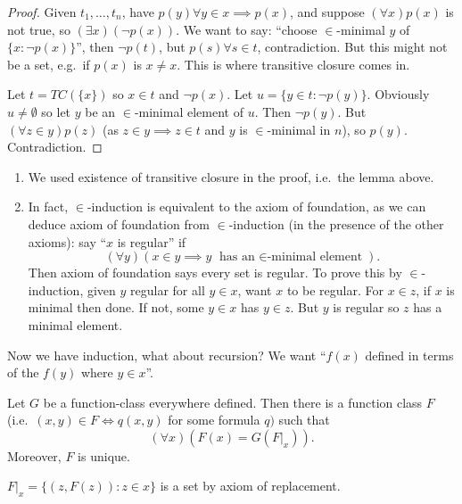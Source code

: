 \documentclass[a4paper]{article}
\begin{document}
\begin{proof}
  Given \(t_1, \dots, t_n\), have \(p(y) \forall y \in x \implies p(x)\), and suppose \((\forall x) p(x)\) is not true, so \((\exists x) (\neg p(x))\). We want to say: ``choose \(\in\)-minimal \(y\) of \(\{x: \neg p(x)\}\)'', then \(\neg p(t)\), but \(p(s) \forall s \in t\), contradiction. But this might not be a set, e.g.\ if \(p(x)\) is \(x \neq x\). This is where transitive closure comes in.

  Let \(t = TC(\{x\})\) so \(x \in t\) and \(\neg p(x)\). Let \(u = \{y \in t: \neg p(y)\}\). Obviously \(u \neq \emptyset\) so let \(y\) be an \(\in\)-minimal element of \(u\). Then \(\neg p(y)\). But \((\forall z \in y) p(z)\) (as \(z \in y \implies z \in t\) and \(y\) is \(\in\)-minimal in \(n\)), so \(p(y)\). Contradiction.
\end{proof}

\begin{remark}\leavevmode
  \begin{enumerate}
  \item We used existence of transitive closure in the proof, i.e.\ the lemma above.
  \item In fact, \(\in\)-induction is equivalent to the axiom of foundation, as we can deduce axiom of foundation from \(\in\)-induction (in the presence of the other axioms): say ``\(x\) is regular'' if
    \[
      (\forall y) (x \in y \implies y \text{ has an \(\in\)-minimal element}).
    \]
    Then axiom of foundation says every set is regular. To prove this by \(\in\)-induction, given \(y\) regular for all \(y \in x\), want \(x\) to be regular. For \(x \in z\), if \(x\) is minimal then done. If not, some \(y \in x\) has \(y \in z\). But \(y\) is regular so \(z\) has a minimal element.
  \end{enumerate}
\end{remark}

Now we have induction, what about recursion? We want ``\(f(x)\) defined in terms of the \(f(y)\) where \(y \in x\)''.

\begin{theorem}[\(\in\)-recursion]
  Let \(G\) be a function-class everywhere defined. Then there is a function class \(F\) (i.e.\ \((x, y) \in F \iff q(x, y)\) for some formula \(q)\) such that
  \[
    (\forall x) (F(x) = G(F|_x)).
  \]
  Moreover, \(F\) is unique.
\end{theorem}

\begin{note}
  \(F|_x = \{(z, F(z)): z \in x\}\) is a set by axiom of replacement.
\end{note}
\end{document}
